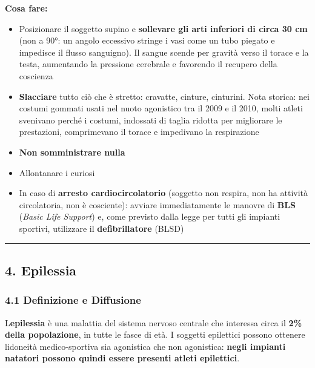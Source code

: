 \documentclass[a4paper,11pt]{article}
\providecommand{\tightlist}{%
  \setlength{\itemsep}{0pt}\setlength{\parskip}{0pt}}
\begin{document}
\textbf{Cosa fare:}

\begin{itemize}
      \tightlist
      \item
            Posizionare il soggetto supino e \textbf{sollevare gli arti inferiori
                  di circa 30 cm} (non a 90°: un angolo eccessivo stringe i vasi come un
            tubo piegato e impedisce il flusso sanguigno). Il sangue scende per
            gravità verso il torace e la testa, aumentando la pressione cerebrale
            e favorendo il recupero della coscienza
      \item
            \textbf{Slacciare} tutto ciò che è stretto: cravatte, cinture,
            cinturini. Nota storica: nei costumi gommati usati nel nuoto
            agonistico tra il 2009 e il 2010, molti atleti svenivano perché i
            costumi, indossati di taglia ridotta per migliorare le prestazioni,
            comprimevano il torace e impedivano la respirazione
      \item
            \textbf{Non somministrare nulla}
      \item
            Allontanare i curiosi
      \item
            In caso di \textbf{arresto cardiocircolatorio} (soggetto non respira,
            non ha attività circolatoria, non è cosciente): avviare immediatamente
            le manovre di \textbf{BLS} (\emph{Basic Life Support}) e, come
            previsto dalla legge per tutti gli impianti sportivi, utilizzare il
            \textbf{defibrillatore} (BLSD)
\end{itemize}

\begin{center}\rule{0.5\linewidth}{0.5pt}\end{center}

\subsection{4. Epilessia}\label{epilessia}

\subsubsection{4.1 Definizione e
      Diffusione}\label{definizione-e-diffusione}

L\textquotesingle{}\textbf{epilessia} è una malattia del sistema nervoso
centrale che interessa circa il \textbf{2\% della popolazione}, in tutte
le fasce di età. I soggetti epilettici possono ottenere
l\textquotesingle idoneità medico-sportiva sia agonistica che non
agonistica: \textbf{negli impianti natatori possono quindi essere
      presenti atleti epilettici}.
\end{document}
